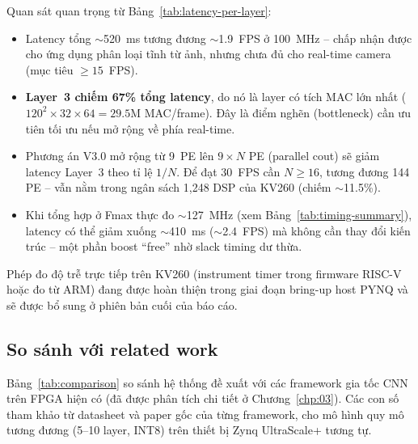 Quan sát quan trọng từ Bảng~\ref{tab:latency-per-layer}:
\begin{itemize}
    \item Latency tổng $\sim$520~ms tương đương $\sim$1.9~FPS ở 100~MHz -- chấp nhận được cho ứng dụng phân loại tĩnh từ ảnh, nhưng chưa đủ cho real-time camera (mục tiêu $\geq 15$~FPS).
    \item \textbf{Layer~3 chiếm 67\% tổng latency}, do nó là layer có tích MAC lớn nhất ($120^2 \times 32 \times 64 = 29.5\text{M}$ MAC/frame). Đây là điểm nghẽn (bottleneck) cần ưu tiên tối ưu nếu mở rộng về phía real-time.
    \item Phương án V3.0 mở rộng từ 9~PE lên $9\times N$ PE (parallel cout) sẽ giảm latency Layer~3 theo tỉ lệ $1/N$. Để đạt 30~FPS cần $N \geq 16$, tương đương 144 PE -- vẫn nằm trong ngân sách 1{,}248 DSP của KV260 (chiếm $\sim$11.5\%).
    \item Khi tổng hợp ở Fmax thực đo $\sim$127~MHz (xem Bảng~\ref{tab:timing-summary}), latency có thể giảm xuống $\sim$410~ms ($\sim$2.4~FPS) mà không cần thay đổi kiến trúc -- một phần boost ``free'' nhờ slack timing dư thừa.
\end{itemize}

Phép đo độ trễ trực tiếp trên KV260 (instrument timer trong firmware RISC-V hoặc đo từ ARM) đang được hoàn thiện trong giai đoạn bring-up host PYNQ và sẽ được bổ sung ở phiên bản cuối của báo cáo.

\subsection{So sánh với related work}

Bảng~\ref{tab:comparison} so sánh hệ thống đề xuất với các framework gia tốc CNN trên FPGA hiện có (đã được phân tích chi tiết ở Chương~\ref{chp:03}). Các con số tham khảo từ datasheet và paper gốc của từng framework, cho mô hình quy mô tương đương (5--10 layer, INT8) trên thiết bị Zynq UltraScale+ tương tự.

